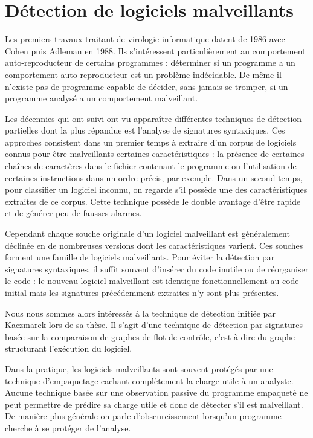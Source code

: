 \section*{Détection de logiciels malveillants}
Les premiers travaux traitant de virologie informatique datent de 1986 avec Cohen \cite{Cohen86} puis Adleman \cite{Adleman88} en 1988. Ils s'intéressent particulièrement au comportement auto-reproducteur de certains programmes : déterminer si un programme a un comportement auto-reproducteur est un problème indécidable. De même il n'existe pas de programme capable de décider, sans jamais se tromper, si un programme analysé a un comportement malveillant.

Les décennies qui ont suivi ont vu apparaître différentes techniques de détection partielles dont la plus répandue est l'analyse de signatures syntaxiques. Ces approches consistent dans un premier temps à extraire d'un corpus de logiciels connus pour être malveillants certaines caractéristiques : la présence de certaines chaînes de caractères dans le fichier contenant le programme ou l'utilisation de certaines instructions dans un ordre précis, par exemple. Dans un second temps, pour classifier un logiciel inconnu, on regarde s'il possède une des caractéristiques extraites de ce corpus.
Cette technique possède le double avantage d'être rapide et de générer peu de fausses alarmes.

Cependant chaque souche originale d'un logiciel malveillant est généralement déclinée en de nombreuses versions dont les caractéristiques varient. Ces souches forment une famille de logiciels malveillants. Pour éviter la détection par signatures syntaxiques, il suffit souvent d'insérer du code inutile ou de réorganiser le code : le nouveau logiciel malveillant est identique fonctionnellement au code initial mais les signatures précédemment extraites n'y sont plus présentes.

Nous nous sommes alors intéressés à la technique de détection initiée par Kaczmarek \cite{BKM08} lors de sa thèse. Il s'agit d'une technique de détection par signatures basée sur la comparaison de graphes de flot de contrôle, c'est à dire du graphe structurant l'exécution du logiciel.

Dans la pratique, les logiciels malveillants sont souvent protégés par une technique d'empaquetage cachant complètement la charge utile à un analyste.
Aucune technique basée sur une observation passive du programme empaqueté ne peut permettre de prédire sa charge utile et donc de détecter s'il est malveillant.
De manière plus générale on parle d'obscurcissement lorsqu'un programme cherche à se protéger de l'analyse.

